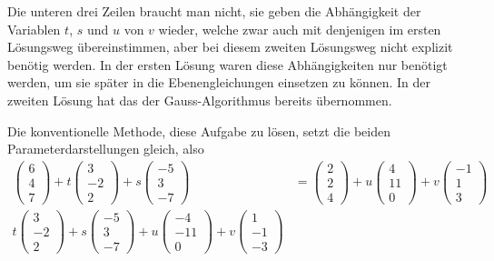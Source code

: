 \begin{loesung}
Die unteren drei Zeilen braucht man
nicht, sie geben die Abhängigkeit der Variablen $t$, $s$ und $u$
von $v$ wieder, welche zwar auch mit denjenigen im ersten Lösungsweg
übereinstimmen, aber bei diesem zweiten Lösungsweg nicht
explizit benötig werden. In der ersten Lösung waren diese
Abhängigkeiten nur benötigt werden, um sie später in die
Ebenengleichungen einsetzen zu können. In der zweiten Lösung
hat das der Gauss-Algorithmus bereits übernommen.

Die konventionelle Methode, diese Aufgabe zu lösen, setzt die beiden 
Parameterdarstellungen gleich, also
\begin{align*}
\begin{pmatrix}6\\4\\7\end{pmatrix}
+t
\begin{pmatrix}3\\-2\\2\end{pmatrix}
+s
\begin{pmatrix}-5\\3\\-7\end{pmatrix}
&=
\begin{pmatrix}2\\2\\4\end{pmatrix}
+u
\begin{pmatrix}4\\11\\0\end{pmatrix}
+v
\begin{pmatrix}-1\\1\\3\end{pmatrix}
\\
t
\begin{pmatrix}3\\-2\\2\end{pmatrix}
+s
\begin{pmatrix}-5\\3\\-7\end{pmatrix}
+u
\begin{pmatrix}-4\\-11\\0\end{pmatrix}
+v
\begin{pmatrix}1\\-1\\-3\end{pmatrix}

\end{align*}
\end{loesung}
